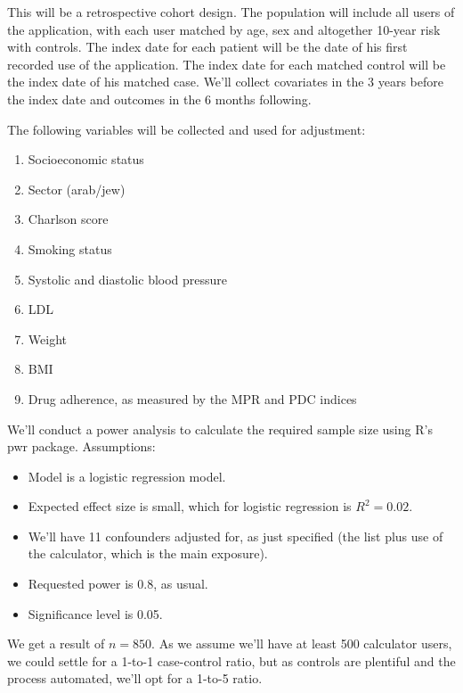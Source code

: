 \documentclass[a4paper,12pt]{article}
\begin{document}
		This will be a retrospective cohort design. The population will include all users of the application, with each user matched by age, sex and altogether 10-year risk with controls. The index date for each patient will be the date of his first recorded use of the application. The index date for each matched control will be the index date of his matched case. We'll collect covariates in the 3 years before the index date and outcomes in the 6 months following.
		
		The following variables will be collected and used for adjustment:
		\begin{enumerate}
			\item Socioeconomic status
			\item Sector (arab/jew)
			\item Charlson score
			\item Smoking status
			\item Systolic and diastolic blood pressure
			\item LDL
			\item Weight
			\item BMI
			\item Drug adherence, as measured by the MPR and PDC indices\cite{Lam2015}
		\end{enumerate}
	
		We'll conduct a power analysis to calculate the required sample size using R's pwr package\cite{Champely2017}. Assumptions:
		\begin{itemize}
			\item Model is a logistic regression model.
			\item Expected effect size is small, which for logistic regression is $ R^2 = 0.02 $\cite{Cohen1988}.
			\item We'll have 11 confounders adjusted for, as just specified (the list plus use of the calculator, which is the main exposure).
			\item Requested power is 0.8, as usual.
			\item Significance level is 0.05.
		\end{itemize}
	
		We get a result of $ n = 850 $. As we assume we'll have at least 500 calculator users, we could settle for a 1-to-1 case-control ratio, but as controls are plentiful and the process automated, we'll opt for a 1-to-5 ratio.
	
\end{document}
